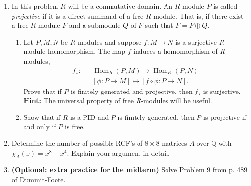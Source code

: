 \documentclass[12pt,
psamsfonts]{amsart}
\theoremstyle{remark}
\theoremstyle{definition}
\newcommand{\Q}{\mathbb{Q}\xspace}
\DeclareMathOperator{\Hom}{Hom}
\numberwithin{equation}{section}
\begin{document}
\begin{enumerate}
\item  In this problem $R$ will be a commutative domain. An $R$-module $P$ is called \textit{projective} if it is a direct summand of a free $R$-module. That is, if there exist a free $R$-module $F$ and a submodule $Q$ of $F$ such that $F=P\oplus Q$. 
\begin{enumerate}
\item Let $P,M,N$ be $R$-modules and suppose $f:M\rightarrow N$ is a surjective $R$-module homomorphism. The map $f$ induces a homomorphism of $R$-modules,
\begin{eqnarray*}
f_\star:&&\Hom_R(P,M)\rightarrow\Hom_R(P,N)\\
&&[\phi:P\rightarrow M]\mapsto [f\circ\phi:P\rightarrow N].
\end{eqnarray*} Prove that if $P$ is finitely generated and projective, then $f_\star$ is surjective.\\ \textbf{Hint:} The universal property of free $R$-modules will be useful. 
\item Show that if $R$ is a PID and $P$ is finitely generated, then $P$ is projective if and only if $P$ is free. 
\\
\end{enumerate}
\item Determine the number of possible RCF's of $8\times 8$ matrices $A$ over $\Q$ with $\chi_A(x)=x^8-x^4$. Explain your argument in detail. 
\\
\item \textbf{(Optional: extra practice for the midterm)} Solve Problem 9 from p. 489 of Dummit-Foote. 




\end{enumerate}
\end{document}
